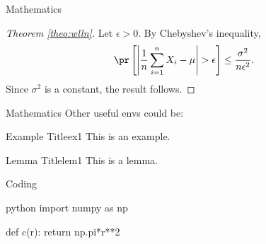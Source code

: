 \documentclass[xcolor=dvipsnames,t,aspectratio=169]{beamer} %
\begin{document}
\begin{frame}[c]{Mathematics}
    \begin{proof}[Theorem \ref*{theo:wlln}] %
        Let $\epsilon > 0$. By Chebyshev's inequality,
        \begin{equation*}
            \pr\left[\left|\frac{1}{n}\sum_{i=1}^n X_i - \mu\right| > \epsilon\right] \leq \frac{\sigma^2}{n\epsilon^2}.
        \end{equation*}
        Since $\sigma^2$ is a constant, the result follows.
        
    \end{proof}
    
\end{frame}

\begin{frame}[c]{Mathematics}
    Other useful envs could be:

    \begin{ex}{Example Title}{ex1}
        This is an example.
    \end{ex}

    \begin{lem}{Lemma Title}{lem1}
        This is a lemma.
    \end{lem}

\end{frame}

\begin{frame}[c, fragile]{Coding}
    \begin{code}{python}
        import numpy as np
        
        def c(r):
            return np.pi*r**2
    \end{code}
\end{frame}
\end{document}
